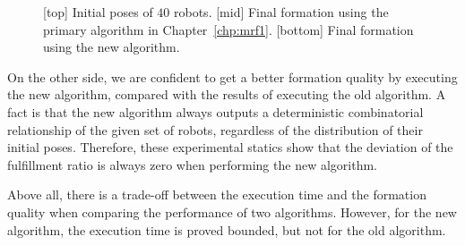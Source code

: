 \begin{figure}
\begin{minipage}{0.7\linewidth}
        \end{minipage}
        \caption{[top] Initial poses of $40$ robots. [mid] Final formation using the primary algorithm in Chapter~\ref{chp:mrf1}. [bottom] Final formation using the new algorithm.}
        \label{fig:forty_sq_comp}
    \end{figure}

  On the other side, we are confident to get a better formation
  quality by executing the new algorithm, compared with the results of
  executing the old algorithm. 
  A fact is that the new algorithm always outputs a
  deterministic combinatorial relationship of the given set of robots,
  regardless of the distribution of their initial poses. 
  Therefore, these
  experimental statics show that the deviation of the fulfillment ratio
  is always zero when performing the new algorithm.


  Above all, there is a trade-off between the execution time and the
  formation quality when comparing the performance of two algorithms.
  However, for the new algorithm, the execution time is proved bounded,
  but not for the old algorithm.


